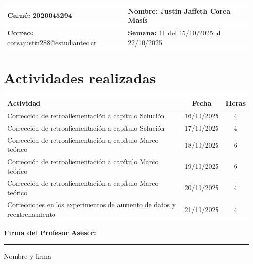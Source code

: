 \documentclass[12pt,a4paper]{article}
\begin{document}
\noindent
\begin{tabularx}{\textwidth}{|X|X|}
\hline
\textbf{Carné:} 2020045294 & \textbf{Nombre:} Justin Jaffeth Corea Masís \\
\hline
\textbf{Correo:} coreajustin288@estudiantec.cr & \textbf{Semana:} 11 del 15/10/2025 al 22/10/2025 \\
\hline
\end{tabularx}

\vspace{0.5cm}

\section*{Actividades realizadas}

\begin{tabularx}{\textwidth}{|>{\raggedright\arraybackslash}p{12cm}|c|c|}
\hline
\textbf{Actividad} & \textbf{Fecha} & \textbf{Horas} \\
\hline
	Corrección de retroaliementación a capítulo Solución & 16/10/2025 & 4 \\
\hline
	Corrección de retroaliementación a capítulo Solución & 17/10/2025 & 4 \\
\hline
	Corrección de retroaliementación a capítulo Marco teórico & 18/10/2025 & 6 \\
\hline
	Corrección de retroaliementación a capítulo Marco teórico & 19/10/2025 & 6 \\
\hline
	Corrección de retroaliementación a capítulo Marco teórico & 20/10/2025 & 4 \\
\hline
	Correcciones en los experimentos de aumento de datos y reentrenamiento & 21/10/2025 & 4 \\
\hline
\end{tabularx}

\vspace{1cm}

\noindent
\textbf{Firma del Profesor Asesor:}

\vspace{2cm}

\noindent\rule{8cm}{0.4pt}  
Nombre y firma
\end{document}
